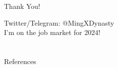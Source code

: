 \documentclass{beamer}
\begin{document}
\begin{frame}{Thank You!}
    
    Twitter/Telegram: @MingXDynasty\\ 
    \bigskip
    I'm on the job market for 2024!
 

\end{frame}

\section*{}

\begin{frame}[allowframebreaks]{References}
    \nocite{*}
    \printbibliography
\end{frame}
\end{document}
